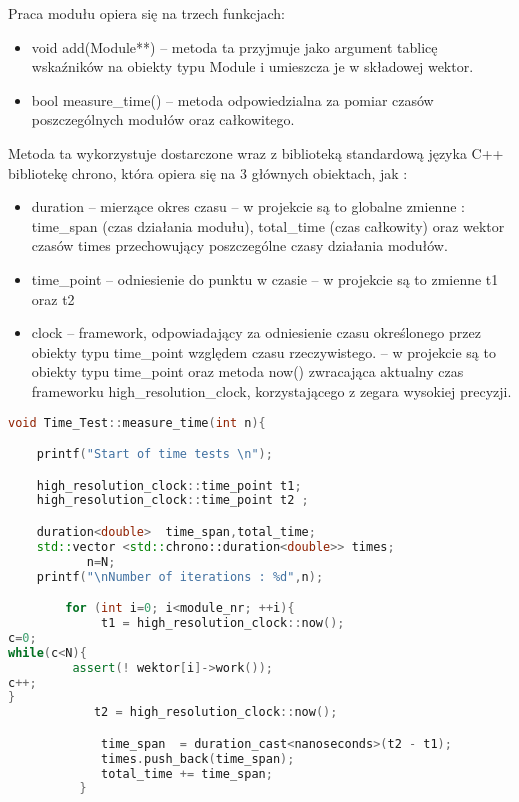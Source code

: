 \begin{description}
\item Praca modułu opiera się na trzech funkcjach:
\begin{itemize}[noitemsep]
\item void add(Module**) – metoda ta przyjmuje jako argument tablicę wskaźników na obiekty typu Module i umieszcza je w składowej wektor.
\item bool measure\_time() – metoda odpowiedzialna za pomiar czasów poszczególnych modułów oraz całkowitego. 
\end{itemize}
\item Metoda ta wykorzystuje dostarczone wraz z biblioteką standardową języka C++ bibliotekę chrono, która opiera się na 3 głównych obiektach, jak : 
\begin{itemize}[noitemsep]
\item duration – mierzące okres czasu – w projekcie są to globalne zmienne : time\_span (czas działania modułu), total\_time (czas całkowity) oraz wektor czasów times przechowujący poszczególne czasy działania modułów.
\item time\_point – odniesienie do punktu w czasie – w projekcie są to zmienne t1 oraz t2
\item clock – framework, odpowiadający za odniesienie czasu określonego przez obiekty typu time\_point względem czasu rzeczywistego. – w projekcie są to obiekty typu  time\_point oraz metoda now() zwracająca aktualny czas frameworku high\_resolution\_clock, korzystającego z zegara wysokiej precyzji.

\end{itemize}
\end{description}


\begin{lstlisting}[caption = {Listing Implementacja funkcji testującej}, label=TestFun, language=C++]
void Time_Test::measure_time(int n){

	printf("Start of time tests \n");

	high_resolution_clock::time_point t1;
	high_resolution_clock::time_point t2 ;

	duration<double>  time_span,total_time;
	std::vector <std::chrono::duration<double>> times;
           n=N;
	printf("\nNumber of iterations : %d",n);

		for (int i=0; i<module_nr; ++i){
			 t1 = high_resolution_clock::now();
c=0;
while(c<N){
		 assert(! wektor[i]->work());
c++;
}	
		 	t2 = high_resolution_clock::now();

			 time_span  = duration_cast<nanoseconds>(t2 - t1);
			 times.push_back(time_span);
			 total_time += time_span;
		  } 

\end{lstlisting}


